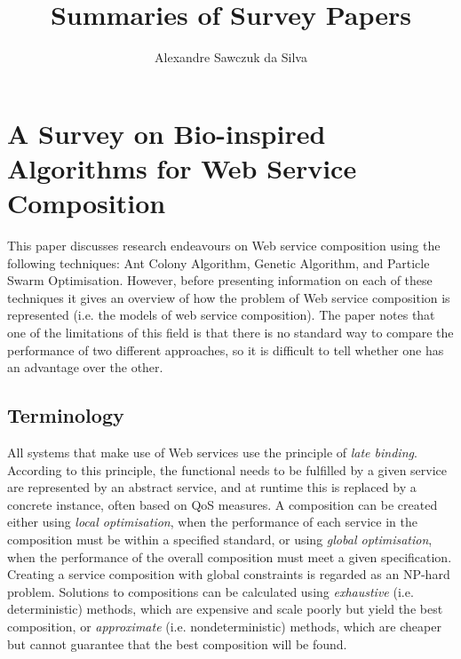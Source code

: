 \documentclass[a4paper,10pt]{article}
\title{Summaries of Survey Papers}
\author{Alexandre Sawczuk da Silva}
\begin{document}
\maketitle

\section{A Survey on Bio-inspired Algorithms for Web Service Composition \cite{wang2012survey}}
This paper discusses research endeavours on Web service composition using the following techniques:
Ant Colony Algorithm, Genetic Algorithm, and Particle Swarm Optimisation.
However, before presenting information on each of these techniques it gives an overview of how the
problem of Web service composition is represented (i.e. the models of web service composition).
The paper notes that one of the limitations of this field is that there is no standard way to compare
the performance of two different approaches, so it is difficult to tell whether one has an advantage
over the other.

\subsection{Terminology}
All systems that make use of Web services use the principle of \textit{late binding}. According to this
principle, the functional needs to be fulfilled by a given service are represented by an abstract service,
and at runtime this is replaced by a concrete instance, often based on QoS measures. A composition can be
created either using \textit{local optimisation}, when the performance of each service in the composition
must be within a specified standard, or using \textit{global optimisation}, when the performance of the
overall composition must meet a given specification.  Creating a service composition with global constraints
is regarded as an NP-hard problem. Solutions to compositions can be calculated using \textit{exhaustive}
(i.e. deterministic) methods, which are expensive and scale poorly but yield the best
composition, or \textit{approximate} (i.e. nondeterministic) methods, which are cheaper but cannot
guarantee that the best composition will be found.
\end{document}
